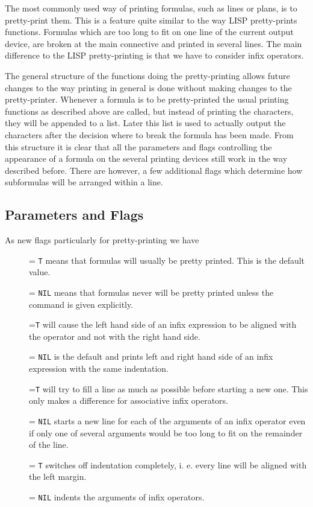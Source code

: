 The most commonly used way of printing formulas, such as lines or plans,
is to pretty-print them. This is a feature quite similar to the way LISP
pretty-prints functions. Formulas which are too long to fit on one line
of the current output device, are broken at the main connective and printed
in several lines. The main difference to the LISP pretty-printing is that
we have to consider infix operators.

The general structure of the functions doing the pretty-printing allows 
future changes to the way printing in general is done without making changes
to the pretty-printer.  Whenever a formula is to be pretty-printed the
usual printing functions as described above are called, but instead of
printing the characters, they will be appended to a list.  Later this list
is used to actually output the characters after the decision where to break
the formula has been made.  From this structure it is clear that all the
parameters and flags controlling the appearance of a formula on the several
printing devices still work in the way described before.  There are however,
a few additional flags which determine how subformulas will be arranged
within a line.

\subsection{Parameters and Flags} \label{Pretty-Printing Flags}

As new flags particularly for pretty-printing we have
\begin{description}

\item [ ] = {\tt T}  means that formulas will usually be pretty printed. 
This is the default value.

 = {\tt NIL} 
means that formulas never will be pretty printed unless the
command is given explicitly.

\item [ ] ={\tt T} 
will cause the left hand side of an infix expression
to be aligned with the operator and not with the right hand side.

 = {\tt NIL} 
is the default and prints left and right hand side of an
infix expression with the same indentation.

\item [ ] ={\tt T} 
will try to fill a line as much as possible before
starting a new one. This only makes a difference for associative
infix operators.

 = {\tt NIL} starts a new line for each of the arguments of an infix operator
even if only one of several arguments would be too long to fit on the 
remainder of the line.

\item [ ] = {\tt T} switches off indentation completely, i. e. every line will
be aligned with the left margin.

 = {\tt NIL}  indents the arguments of infix operators.
\end{description}

